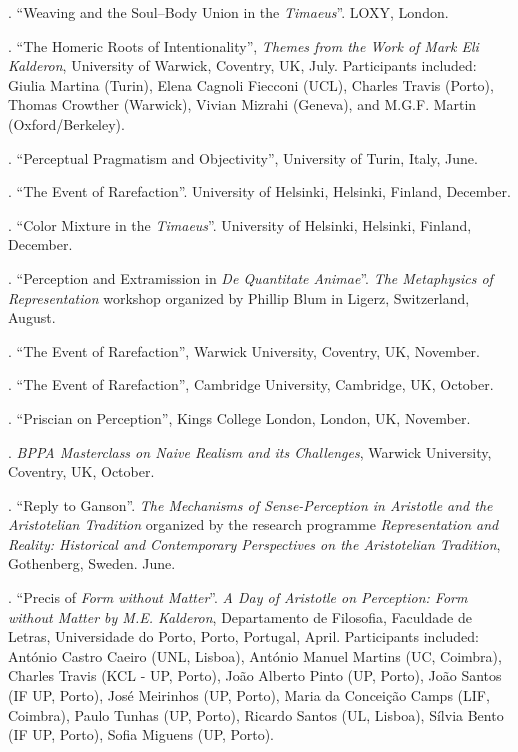 \documentclass[11pt]{article}
\begin{document}
. ``Weaving and the Soul–Body Union in the \emph{Timaeus}''. LOXY, London.

. ``The Homeric Roots of Intentionality'', \emph{Themes from the Work of Mark Eli Kalderon}, University of Warwick, Coventry, UK, July. Participants included: Giulia Martina (Turin), Elena Cagnoli Fiecconi (UCL), Charles Travis (Porto), Thomas Crowther (Warwick), Vivian Mizrahi (Geneva), and M.G.F. Martin (Oxford/Berkeley).

. ``Perceptual Pragmatism and Objectivity'', University of Turin, Italy, June.

. ``The Event of Rarefaction''. University of Helsinki, Helsinki, Finland, December.

. ``Color Mixture in the \emph{Timaeus}''. University of Helsinki, Helsinki, Finland, December.

. ``Perception and Extramission in \emph{De Quantitate Animae}''. \emph{The Metaphysics of Representation} workshop organized by Phillip Blum in Ligerz, Switzerland, August.

. ``The Event of Rarefaction'', Warwick University, Coventry, UK, November.

. ``The Event of Rarefaction'', Cambridge University, Cambridge, UK, October.

. ``Priscian on Perception'', Kings College London, London, UK, November.

. \emph{BPPA Masterclass on Naive Realism and its Challenges}, Warwick University, Coventry, UK, October.

. ``Reply to Ganson''. \emph{The Mechanisms of Sense-Perception in Aristotle and the Aristotelian Tradition} organized by the research programme
\emph{Representation and Reality: Historical and Contemporary Perspectives on the Aristotelian Tradition}, Gothenberg, Sweden. June.

. ``Precis of \emph{Form without Matter}''. \emph{A Day of Aristotle on Perception: Form without Matter by M.E. Kalderon}, Departamento de Filosofia, Faculdade de Letras, Universidade do Porto, Porto, Portugal, April. Participants included: António Castro Caeiro (UNL, Lisboa), António Manuel Martins (UC, Coimbra), Charles Travis (KCL - UP, Porto), João Alberto Pinto (UP, Porto), João Santos (IF UP, Porto), José Meirinhos (UP, Porto), Maria da Conceição Camps (LIF, Coimbra), Paulo Tunhas (UP, Porto), Ricardo Santos (UL, Lisboa), Sílvia Bento (IF UP, Porto), Sofia Miguens (UP, Porto).
\end{document}
